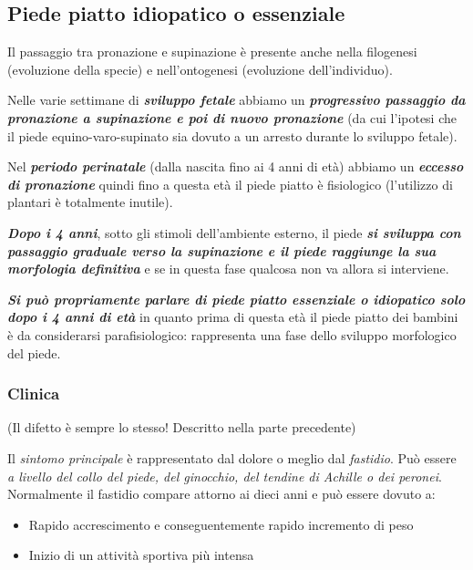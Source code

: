 \subsection{Piede piatto idiopatico o essenziale}

Il passaggio tra pronazione e supinazione è presente anche nella filogenesi (evoluzione della specie) e nell'ontogenesi (evoluzione dell'individuo).

Nelle varie settimane di \textbf{\emph{sviluppo fetale}} abbiamo un \textbf{\emph{progressivo passaggio da pronazione a supinazione e poi di nuovo pronazione}} (da cui l'ipotesi che il piede equino-varo-supinato sia dovuto a un arresto durante lo sviluppo fetale).

Nel \textbf{\emph{periodo perinatale}} (dalla nascita fino ai 4 anni di età) abbiamo un \textbf{\emph{eccesso di pronazione}} quindi fino a questa età il piede piatto è fisiologico (l'utilizzo di plantari è totalmente inutile).

\textbf{\emph{Dopo i 4 anni}}, sotto gli stimoli dell'ambiente esterno, il piede \textbf{\emph{si sviluppa con passaggio graduale verso la supinazione e il piede raggiunge la sua morfologia definitiva}} e se in questa fase qualcosa non va allora si interviene.

\textbf{\emph{Si può propriamente parlare di piede piatto essenziale o idiopatico solo dopo i 4 anni di età}} in quanto prima di questa età il piede piatto dei bambini è da considerarsi parafisiologico: rappresenta una fase dello sviluppo morfologico del piede.

\subsubsection{Clinica}

(Il difetto è sempre lo stesso! Descritto nella parte precedente)

Il \emph{sintomo principale} è rappresentato dal dolore o meglio dal \emph{fastidio}. Può essere \emph{a livello del collo del piede, del ginocchio, del tendine di Achille o dei peronei}. Normalmente il fastidio compare attorno ai dieci anni e può essere dovuto a:

\begin{itemize}
\item
  Rapido accrescimento e conseguentemente rapido incremento di peso
\item
  Inizio di un attività sportiva più intensa
\end{itemize}

